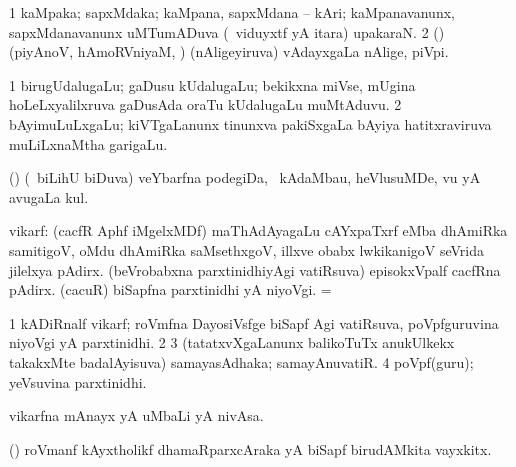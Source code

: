 {{{{{\bentry
{} 
\gl{\nA}
\expl{}
\bmng
\bnum
\num{1} kaMpaka; sapxMdaka; kaMpana, sapxMdana -- kAri; kaMpanavanunx, sapxMdanavanunx uMTumADuva (\kanmu\ viduyxtf yA itara) upakaraN. 
\num{2} (\saM) (piyAnoV, hAmoRVniyaM, \mo) (nAligeyiruva) vAdayxgaLa nAlige, piVpi. 
\enum
\emng
\eentry

\bentry
{} 
\gl{\gu}
\expl{}
\bmng
\emng
\eentry

\bentry
{} 
\gl{\nA}
\expl{(\bava)}
\bmng
\bnum
\num{1} birugUdalugaLu; gaDusu kUdalugaLu; bekikxna miVse, mUgina hoLeLxyalilxruva gaDusAda oraTu kUdalugaLu muMtAduvu. 
\num{2} bAyimuLuLxgaLu; kiVTgaLanunx tinunxva pakiSxgaLa bAyiya hatitxraviruva muLiLxnaMtha garigaLu. 
\enum
\emng
\eentry

\bentry
{} 
\gl{\nA}
\expl{}
\bmng
 (\savi) (\sA\ biLihU biDuva) veYbarfna podegiDa, \udA\ kAdaMbau, heVlusuMDe, \mo vu yA avugaLa kul. 
\emng
\eentry

\bentry
{}
\gl{\saMkiSx}
\expl{}
\bmng
\emng
\eentry

\bentry
{} 
\gl{\nA}
\expl{}
\bmng
 vikarf: 
\banum
{} (cacfR Aphf iMgelxMDf) maThAdAyagaLu cAYxpaTxrf eMba dhAmiRka samitigoV, oMdu dhAmiRka saMsethxgoV, illxve obabx lwkikanigoV seVrida jilelxya pAdirx. 
 (beVrobabxna parxtinidhiyAgi vatiRsuva) episokxVpalf cacfRna pAdirx. 
 (\roVkAyx cacuR) biSapfna parxtinidhi yA niyoVgi. 
 =  
\eanum
\emng

\noindent
\gl{\pagu}
\expl{}
\bmng
\bnum
\num{1} kADiRnalf vikarf; roVmfna DayosiVsfge biSapf Agi vatiRsuva, poVpfguruvina niyoVgi yA parxtinidhi. 
\num{2}  
\num{3}  (tatatxvXgaLanunx balikoTuTx anukUlkekx takakxMte badalAyisuva) samayasAdhaka; samayAnuvatiR. 
\num{4}  poVpf(guru); yeVsuvina parxtinidhi. 
\enum
\emng
\eentry

\bentry
{} 
\gl{\nA}
\expl{}
\bmng
 vikarfna mAnayx yA uMbaLi yA nivAsa. 
\emng
\eentry

\bentry
{}
\gl{\nA}
\expl{}
\bmng
 (\roVkAyx) roVmanf kAyxtholikf dhamaRparxcAraka yA biSapf birudAMkita vayxkitx. 
\emng
\eentry

}}}}}

